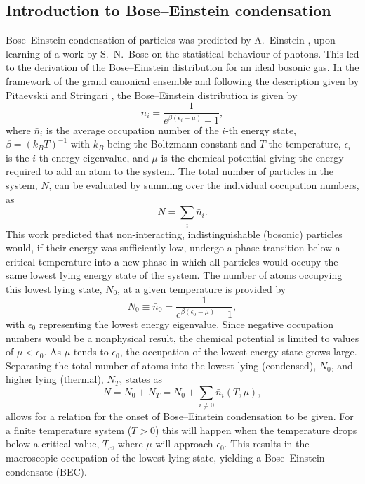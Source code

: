 \subsection{Introduction to Bose--Einstein condensation}\label{sub:becintro}
Bose--Einstein condensation of particles was predicted by A.~Einstein \cite{Einstein_bec_1925}, upon learning of a work by S.~N.~Bose on the statistical behaviour of photons. This led to the derivation of the Bose--Einstein distribution for an ideal bosonic gas. In the framework of the grand canonical ensemble and following the description given by Pitaevskii and Stringari \cite[chap. 2]{BK:Pitaevskii_Stringari_2003}, the Bose--Einstein distribution is given by
\begin{equation}
\bar{n}_i = \frac{1}{e^{\beta(\epsilon_i - \mu)} -1},
\end{equation}
where $\bar{n}_i$ is the average occupation number of the $i$-th energy state, $\beta=(k_BT)^{-1}$ with $k_B$ being the Boltzmann constant and $T$ the temperature, $\epsilon_i$ is the $i$-th energy eigenvalue, and $\mu$ is the chemical potential giving the energy required to add an atom to the system.
The total number of particles in the system, $N$, can be evaluated by summing over the individual occupation numbers, as
\begin{equation}
N=\displaystyle\sum_i \bar{n}_i.
\end{equation}
This work predicted that non-interacting, indistinguishable (bosonic) particles would, if their energy was sufficiently low, undergo a phase transition below a critical temperature into a new phase in which all particles would occupy the same lowest lying energy state of the system. The number of atoms occupying this lowest lying state, $N_0$, at a given temperature is provided by
\begin{equation}
N_0 \equiv \bar{n}_0 = \frac{1}{e^{\beta(\epsilon_0 - \mu)} - 1},
\end{equation}
with $\epsilon_0$ representing the lowest energy eigenvalue. Since negative occupation numbers would be a nonphysical result, the chemical potential is limited to values of $\mu < \epsilon_0$. As $\mu$ tends to $\epsilon_0$, the occupation of the lowest energy state grows large. Separating the total number of atoms into the lowest lying (condensed), $N_0$, and higher lying (thermal), $N_T$, states as
\begin{equation}
N = N_0 + N_T = N_0 + \displaystyle\sum_{i\neq 0}\bar{n}_i(T,\mu),
\end{equation}
allows for a relation for the onset of Bose--Einstein condensation to be given. For a finite temperature system ($T>0$) this will happen when the temperature drops below a critical value, $T_c$, where $\mu$ will approach $\epsilon_0$. This results in the macroscopic occupation of the lowest lying state, yielding a Bose--Einstein condensate (BEC).

